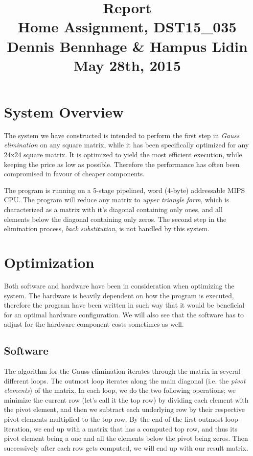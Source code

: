 \documentclass[a4paper,9pt,fleqn]{article}
\title{
{\bf Report}\\
\vspace{0.2cm}
%
Home Assignment, DST15\_035\\
\vspace{1cm}
%
{\large Dennis Bennhage \& Hampus Lidin}\\
\vspace{10cm}
%
May 28th, 2015
}
\date{}
\begin{document}
\maketitle

\newpage

\section{System Overview}
The system we have constructed is intended to perform the first step in {\it Gauss elimination}
on any square matrix, while it has been specifically optimized for any 24x24 square matrix.
It is optimized to yield the most efficient execution, while keeping the price as low as
possible. Therefore the performance has often been compromised in favour of cheaper components.

The program is running on a 5-stage pipelined, word (4-byte) addressable MIPS CPU. The program will
reduce any matrix to {\it upper triangle form}, which is characterized as a matrix with it's diagonal 
containing only ones, and all elements below the diagonal containing only zeros. The second step in the 
elimination process, {\it back substitution}, is not handled by this system.

\section{Optimization}
Both software and hardware have been in consideration when optimizing the system. The hardware
is heavily dependent on how the program is executed, therefore the program have been 
written in such way that it would be beneficial for an optimal hardware configuration. We will
also see that the software has to adjust for the hardware component costs sometimes as well.

\subsection{Software}
The algorithm for the Gauss elimination iterates through the matrix in several different loops.
The outmost loop iterates along the main diagonal (i.e. the {\it pivot elements}) of the matrix.
In each loop, we do the two following operations; we minimize the current row (let's call it the
top row) by dividing each element with the pivot element, and then we subtract each underlying row
by their respective pivot elements multiplied to the top row. By the end of the first outmost
loop-iteration, we end up with a matrix that has a computed top row, and thus its pivot element being
a one and all the elements below the pivot being zeros. Then successively after each row gets computed,
we will end up with our result matrix.
\end{document}
